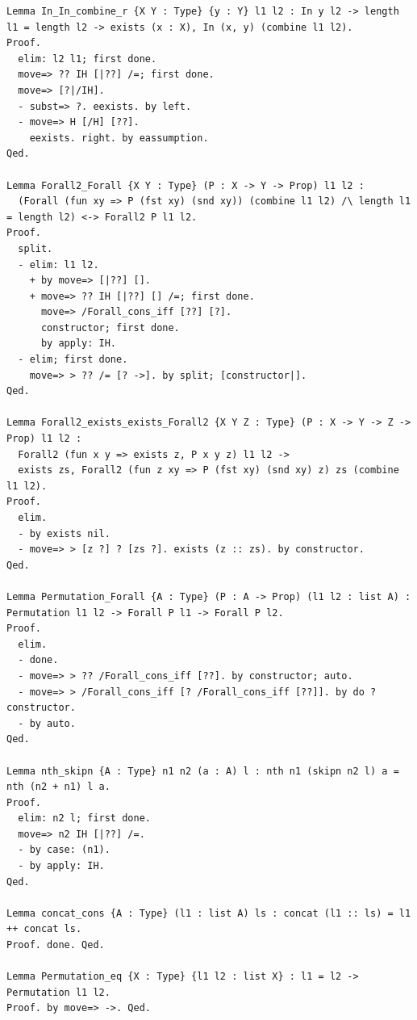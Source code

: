 \begin{lstlisting}[style=authorcoq]
Lemma In_In_combine_r {X Y : Type} {y : Y} l1 l2 : In y l2 -> length l1 = length l2 -> exists (x : X), In (x, y) (combine l1 l2).
Proof.
  elim: l2 l1; first done.
  move=> ?? IH [|??] /=; first done.
  move=> [?|/IH].
  - subst=> ?. eexists. by left.
  - move=> H [/H] [??].
    eexists. right. by eassumption.
Qed.

Lemma Forall2_Forall {X Y : Type} (P : X -> Y -> Prop) l1 l2 :
  (Forall (fun xy => P (fst xy) (snd xy)) (combine l1 l2) /\ length l1 = length l2) <-> Forall2 P l1 l2.
Proof.
  split.
  - elim: l1 l2.
    + by move=> [|??] [].
    + move=> ?? IH [|??] [] /=; first done.
      move=> /Forall_cons_iff [??] [?].
      constructor; first done.
      by apply: IH.
  - elim; first done.
    move=> > ?? /= [? ->]. by split; [constructor|].
Qed.

Lemma Forall2_exists_exists_Forall2 {X Y Z : Type} (P : X -> Y -> Z -> Prop) l1 l2 :
  Forall2 (fun x y => exists z, P x y z) l1 l2 ->
  exists zs, Forall2 (fun z xy => P (fst xy) (snd xy) z) zs (combine l1 l2).
Proof.
  elim.
  - by exists nil.
  - move=> > [z ?] ? [zs ?]. exists (z :: zs). by constructor.
Qed.

Lemma Permutation_Forall {A : Type} (P : A -> Prop) (l1 l2 : list A) : Permutation l1 l2 -> Forall P l1 -> Forall P l2.
Proof.
  elim.
  - done.
  - move=> > ?? /Forall_cons_iff [??]. by constructor; auto.
  - move=> > /Forall_cons_iff [? /Forall_cons_iff [??]]. by do ? constructor.
  - by auto.
Qed.

Lemma nth_skipn {A : Type} n1 n2 (a : A) l : nth n1 (skipn n2 l) a = nth (n2 + n1) l a.
Proof.
  elim: n2 l; first done.
  move=> n2 IH [|??] /=.
  - by case: (n1).
  - by apply: IH.
Qed.

Lemma concat_cons {A : Type} (l1 : list A) ls : concat (l1 :: ls) = l1 ++ concat ls.
Proof. done. Qed.

Lemma Permutation_eq {X : Type} {l1 l2 : list X} : l1 = l2 -> Permutation l1 l2.
Proof. by move=> ->. Qed.


\end{lstlisting}
